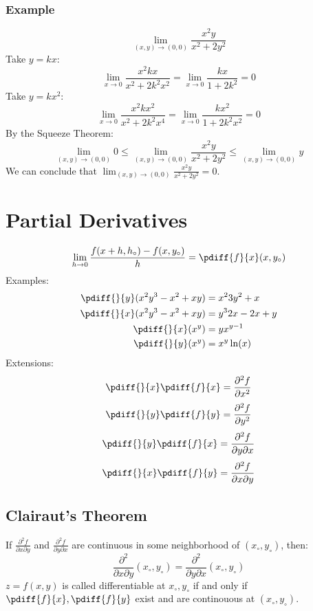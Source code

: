 \documentclass[letterpaper, 12pt]{math}
\begin{document}
\subsubsection*{Example}
\[ \lim_{(x,y)\to(0,0)}\frac{x^2y}{x^2+2y^2} \]
Take \( y = kx \):
\[ \lim_{x\to0}\frac{x^2kx}{x^2+2k^2x^2} = \lim_{x\to0}\frac{kx}{1+2k^2} = 0 \]
Take \( y = kx^2 \):
\[ \lim_{x\to0}\frac{x^2kx^2}{x^2+2k^2x^4} = \lim_{x\to0}\frac{kx^2}{1+2k^2x^2}
  = 0 \]
By the Squeeze Theorem:
\[ \lim_{(x,y)\to(0,0)}0 \le \lim_{(x,y)\to(0,0)}\frac{x^2y}{x^2+2y^2} \le
  \lim_{(x,y)\to(0,0)}y \]
We can conclude that \( \lim_{(x,y)\to(0,0)}\frac{x^2y}{x^2+2y^2} = 0 \).

\section*{Partial Derivatives}
\[ \lim_{h\to0}\frac{f(x+h,h_{\circ})-f(x,y_{\circ})}{h} =
  \pdiff{f}{x}(x,y_{\circ}) \]
Examples:
\begin{align*}
  \pdiff{}{y}(x^2y^3-x^2+xy) &= x^23y^2+x \\
  \pdiff{}{x}(x^2y^3-x^2+xy) &= y^32x-2x+y \\
  \pdiff{}{x}(x^y) &= yx^{y-1} \\
  \pdiff{}{y}(x^y) &= x^y\ln(x)
\end{align*}
Extensions:
\[ \pdiff{}{x}\pdiff{f}{x} = \frac{\partial^2{f}}{\partial{x^2}} \]
\[ \pdiff{}{y}\pdiff{f}{y} = \frac{\partial^2{f}}{\partial{y^2}} \]
\[ \pdiff{}{y}\pdiff{f}{x} = \frac{\partial^2{f}}{\partial{y}\partial{x}} \]
\[ \pdiff{}{x}\pdiff{f}{y} = \frac{\partial^2{f}}{\partial{x}\partial{y}} \]

\subsection*{Clairaut's Theorem}
If \( \frac{\partial^2{f}}{\partial{x}\partial{y}} \) and \(
\frac{\partial^2{f}}{\partial{y}\partial{x}} \) are continuous in some
neighborhood of \( (x_{\circ},y_{\circ}) \), then:
\[ \frac{\partial^2}{\partial{x}\partial{y}}(x_{\circ},y_{\circ}) =
  \frac{\partial^2}{\partial{y}\partial{x}}(x_{\circ},y_{\circ}) \]
\( z = f(x,y) \) is called differentiable at \( x_{\circ},y_{\circ} \) if and
only if \( \pdiff{f}{x},\pdiff{f}{y} \) exist and are continouous at \(
(x_{\circ},y_{\circ}) \).
\end{document}
